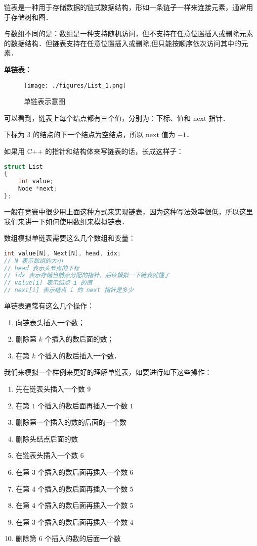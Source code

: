
链表是一种用于存储数据的链式数据结构，形如一条链子一样来连接元素，通常用于存储树和图．

与数组不同的是：数组是一种支持随机访问，但不支持在任意位置插入或删除元素的数据结构．但链表支持在任意位置插入或删除,但只能按顺序依次访问其中的元素．

\textbf{单链表：}

\begin{figure}[ht]
\centering
\texttt{[image: ./figures/List\_1.png]}
\caption{单链表示意图} \label{List_fig1}
\end{figure}

可以看到，链表上每个结点都有三个值，分别为：下标、值和 $\text{next}$ 指针．

下标为 $3$ 的结点的下一个结点为空结点，所以 $\text{next}$ 值为 $-1$．

如果用 C++ 的指针和结构体来写链表的话，长成这样子：
\begin{lstlisting}[language=cpp]
struct List
{
    int value;
    Node *next;
};
\end{lstlisting}

一般在竞赛中很少用上面这种方式来实现链表，因为这种写法效率很低，所以这里我们来讲一下如何使用数组来模拟链表．

数组模拟单链表需要这么几个数组和变量：
\begin{lstlisting}[language=cpp]
int value[N], Next[N], head, idx;
// N 表示数组的大小
// head 表示头节点的下标
// idx 表示存储当前点分配的指针，后续模拟一下链表就懂了
// value[i] 表示结点 i 的值
// next[i] 表示结点 i 的 next 指针是多少
\end{lstlisting}

单链表通常有这么几个操作：
\begin{enumerate}
\item 向链表头插入一个数；
\item 删除第 $k$ 个插入的数后面的数；
\item 在第 $k$ 个插入的数后插入一个数．
\end{enumerate}

我们来模拟一个样例来更好的理解单链表，如要进行如下这些操作：

\begin{enumerate}
\item 先在链表头插入一个数 $9$
\item 在第 $1$ 个插入的数后面再插入一个数 $1$
\item 删除第一个插入的数的后面的一个数
\item 删除头结点后面的数
\item 在链表头插入一个数 $6$
\item 在第 $3$ 个插入的数后面再插入一个数 $6$
\item 在第 $4$ 个插入的数后面再插入一个数 $5$
\item 在第 $4$ 个插入的数后面再插入一个数 $5$
\item 在第 $3$ 个插入的数后面再插入一个数 $4$
\item 删除第 $6$ 个插入的数的后面一个数
\end{enumerate}

